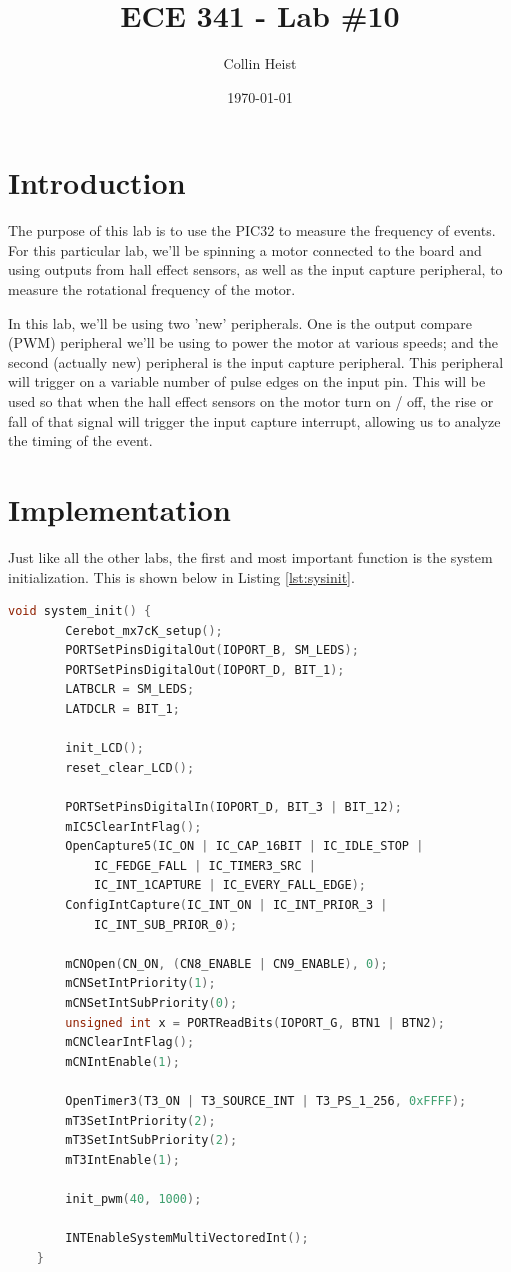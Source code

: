 \documentclass[a4paper, 12pt]{article}
\begin{document}
\title{ECE 341 - Lab \#10}
\author{Collin Heist}
\date{\today}
\maketitle
{}
\tableofcontents
\lstlistoflistings
\newpage
{}

\section{Introduction}
The purpose of this lab is to use the PIC32 to measure the frequency of events. For this particular lab, we'll be spinning a motor connected to the board and using outputs from hall effect sensors, as well as the input capture peripheral, to measure the rotational frequency of the motor. 

In this lab, we'll be using two 'new' peripherals. One is the output compare (PWM) peripheral we'll be using to power the motor at various speeds; and the second (actually new) peripheral is the input capture peripheral. This peripheral will trigger on a variable number of pulse edges on the input pin. This will be used so that when the hall effect sensors on the motor turn on / off, the rise or fall of that signal will trigger the input capture interrupt, allowing us to analyze the timing of the event.

\section{Implementation}
Just like all the other labs, the first and most important function is the system initialization. This is shown below in Listing  \ref{lst:sysinit}.

	\begin{mdframed}[backgroundcolor=code-gray, roundcorner=10pt,
								innerleftmargin=5, innertopmargin=5, innerbottommargin=5]	
	\begin{lstlisting}[language=C, caption=System Initialization, tabsize=2, label={lst:sysinit}]
	void system_init() {
		Cerebot_mx7cK_setup();
		PORTSetPinsDigitalOut(IOPORT_B, SM_LEDS);
		PORTSetPinsDigitalOut(IOPORT_D, BIT_1);
		LATBCLR = SM_LEDS;
		LATDCLR = BIT_1; 

		init_LCD();
		reset_clear_LCD();

		PORTSetPinsDigitalIn(IOPORT_D, BIT_3 | BIT_12);
		mIC5ClearIntFlag();	
		OpenCapture5(IC_ON | IC_CAP_16BIT | IC_IDLE_STOP |
			IC_FEDGE_FALL | IC_TIMER3_SRC |
			IC_INT_1CAPTURE | IC_EVERY_FALL_EDGE);
		ConfigIntCapture(IC_INT_ON | IC_INT_PRIOR_3 |
			IC_INT_SUB_PRIOR_0);
	
		mCNOpen(CN_ON, (CN8_ENABLE | CN9_ENABLE), 0);
		mCNSetIntPriority(1);
		mCNSetIntSubPriority(0);
		unsigned int x = PORTReadBits(IOPORT_G, BTN1 | BTN2);
		mCNClearIntFlag();
		mCNIntEnable(1);

		OpenTimer3(T3_ON | T3_SOURCE_INT | T3_PS_1_256, 0xFFFF);
		mT3SetIntPriority(2);
		mT3SetIntSubPriority(2);
		mT3IntEnable(1);

		init_pwm(40, 1000);

		INTEnableSystemMultiVectoredInt();
	}
	\end{lstlisting}
	\end{mdframed}
	
\end{document}
